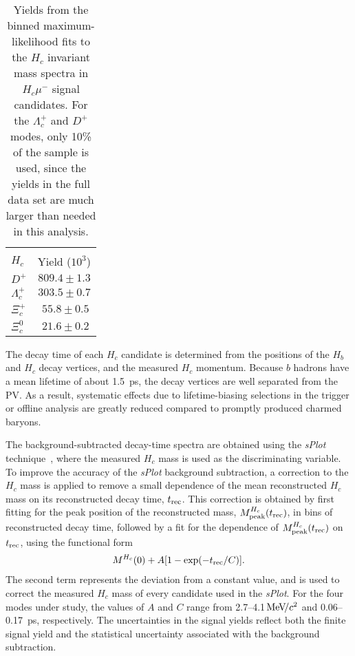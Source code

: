 \documentclass[12pt,a4paper]{article}
\def\Pmu         {\ensuremath{\upmu}\xspace}
\def\PXi         {\ensuremath{\Xi}\xspace}
\def\PLambda     {\ensuremath{\Lambda}\xspace}
\def\PD      {\ensuremath{\mathrm{D}}\xspace}
\def\Pc      {\ensuremath{\mathrm{c}}\xspace}
\def\Pmu         {\ensuremath{\mu}\xspace}
\def\PD      {\ensuremath{D}\xspace}
\def\Pc      {\ensuremath{c}\xspace}
\def\mun        {{\ensuremath{\Pmu^-}}\xspace} \def\mupm       {{\ensuremath{\Pmu^\pm}}\xspace}
\def\cquark    {{\ensuremath{\Pc}}\xspace}
\def\D       {{\ensuremath{\PD}}\xspace}
\def\Dp      {{\ensuremath{\D^+}}\xspace}
\def\Lz          {{\ensuremath{\PLambda}}\xspace}
\def\Xires       {{\ensuremath{\PXi}}\xspace}
\def\Lc          {{\ensuremath{\Lz^+_\cquark}}\xspace}
\def\Xicz        {{\ensuremath{\Xires^0_\cquark}}\xspace}
\def\Xicp        {{\ensuremath{\Xires^+_\cquark}}\xspace}
\newcommand{\aunit}[1]{\ensuremath{\text{\,#1}}}
\newcommand{\mevcc}{\ensuremath{\aunit{Me\kern -0.1em V\!/}c^2}\xspace}
\def\sPlot{\mbox{\em sPlot}\xspace}
\begin{document}
\begin{table*}[b]
\begin{center}
\caption{\small{Yields from the binned maximum-likelihood fits to the $H_c$ invariant mass spectra in $H_c\mun$ signal candidates. For the
$\Lc$ and $\Dp$ modes, only 10\% of the sample is used, since the yields in the full data set are much larger than needed in this analysis.}}
\begin{tabular}{lc}
\hline\hline
\\ [-2.5ex]
$H_c$                         &  Yield ($10^3$) \\
\hline  
$\Dp$                           &  $809.4\pm1.3$ \\
$\Lc$                           &  $303.5\pm0.7$ \\
$\Xicp$                         &  $~55.8\pm0.5$ \\
$\Xicz$                         &  $~21.6\pm0.2$ \\
\hline\hline
\end{tabular}
\label{tab:yields}
\end{center}
\end{table*}

The decay time of each $H_c$ candidate is determined from the positions of the $H_b$ and $H_c$ decay vertices, and the measured 
$H_c$ momentum. Because $b$ hadrons have a mean lifetime of about 1.5~ps, the decay vertices are well separated from the PV.
As a result, systematic effects due to lifetime-biasing selections in the trigger or offline analysis are greatly reduced compared to
promptly produced charmed baryons. 

The background-subtracted decay-time spectra are obtained using the \sPlot technique~\cite{Pivk:2004ty}, where the 
measured $H_c$ mass is used as the discriminating variable. To improve the accuracy of the \sPlot background subtraction, a correction
to the $H_c$ mass is applied to remove a small dependence of the mean reconstructed $H_c$ mass on its reconstructed decay time, $t_{\rm rec}$.
This correction is obtained by first fitting for the peak position of the reconstructed mass, $M_{\rm peak}^{H_c}(t_{\rm rec})$, in bins of
reconstructed decay time, followed by a fit for the dependence of $M_{\rm peak}^{H_c}(t_{\rm rec})$ on $t_{\rm rec}$, using the functional form
\begin{align}
M^{H_c}(0)+A[1-\exp(-t_{\rm rec}/C)].
\end{align}
The second term represents the deviation from a constant value, and is used to correct the measured $H_c$ mass of every candidate used in the \sPlot. 
For the four modes under study, the values of $A$ and $C$ range from 2.7--4.1\mevcc and 0.06--0.17~ps, respectively. 
The uncertainties in the signal yields reflect both the finite signal yield and the statistical uncertainty associated with the background subtraction.
\end{document}
